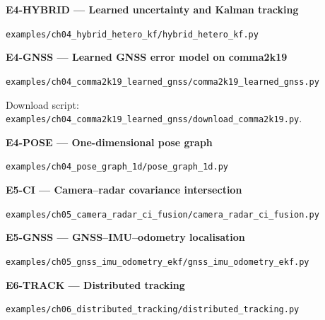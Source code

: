 \documentclass[graybox,envcountchap]{style/SNmono}
\newcommand{\repopath}[1]{\texttt{#1}}
\begin{document}
\par\medskip{}\label{code:E4-HYBRID}
\noindent\textbf{E4-HYBRID --- Learned uncertainty and Kalman tracking}\par
\noindent\repopath{examples/\allowbreak ch04\_\allowbreak hybrid\_\allowbreak hetero\_\allowbreak kf/\allowbreak hybrid\_\allowbreak hetero\_\allowbreak kf.py}\par

\par\medskip{}\label{code:E4-GNSS}
\noindent\textbf{E4-GNSS --- Learned GNSS error model on comma2k19}\par
\noindent\repopath{examples/\allowbreak ch04\_\allowbreak comma2k19\_\allowbreak learned\_\allowbreak gnss/\allowbreak comma2k19\_\allowbreak learned\_\allowbreak gnss.py}\par
Download script: \repopath{examples/\allowbreak ch04\_\allowbreak comma2k19\_\allowbreak learned\_\allowbreak gnss/\allowbreak download\_\allowbreak comma2k19.py}.\par

\par\medskip{}\label{code:E4-POSE}
\noindent\textbf{E4-POSE --- One-dimensional pose graph}\par
\noindent\repopath{examples/\allowbreak ch04\_\allowbreak pose\_\allowbreak graph\_\allowbreak 1d/\allowbreak pose\_\allowbreak graph\_\allowbreak 1d.py}\par

\par\medskip{}\label{code:E5-CI}
\noindent\textbf{E5-CI --- Camera--radar covariance intersection}\par
\noindent\repopath{examples/\allowbreak ch05\_\allowbreak camera\_\allowbreak radar\_\allowbreak ci\_\allowbreak fusion/\allowbreak camera\_\allowbreak radar\_\allowbreak ci\_\allowbreak fusion.py}\par

\par\medskip{}\label{code:E5-GNSS}
\noindent\textbf{E5-GNSS --- GNSS--IMU--odometry localisation}\par
\noindent\repopath{examples/\allowbreak ch05\_\allowbreak gnss\_\allowbreak imu\_\allowbreak odometry\_\allowbreak ekf/\allowbreak gnss\_\allowbreak imu\_\allowbreak odometry\_\allowbreak ekf.py}\par

\par\medskip{}\label{code:E6-TRACK}
\noindent\textbf{E6-TRACK --- Distributed tracking}\par
\noindent\repopath{examples/\allowbreak ch06\_\allowbreak distributed\_\allowbreak tracking/\allowbreak distributed\_\allowbreak tracking.py}\par
\end{document}

